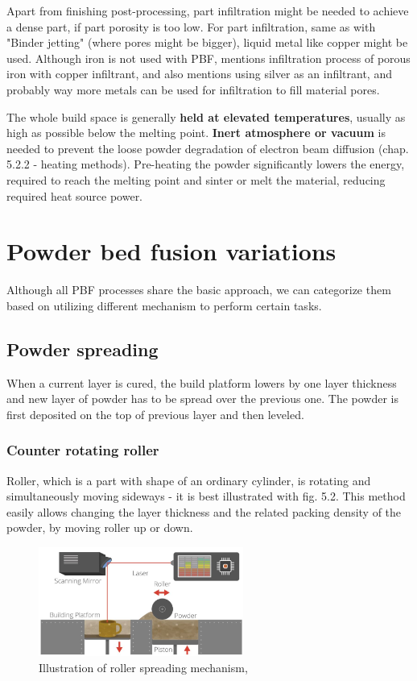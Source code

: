 \documentclass[a4paper, twoside, 11pt]{report}
\begin{document}
	Apart from finishing post-processing, part infiltration might be needed to achieve a dense part, if part porosity is too low. For part infiltration, same as with "Binder jetting" (where pores might be bigger), liquid metal like copper might be used. Although iron is not used with PBF, \cite[162]{LPS} mentions infiltration process of porous iron with copper infiltrant, and also mentions using silver as an infiltrant, and probably way more metals can be used for infiltration to fill material pores.
	
	The whole build space is generally \textbf{held at elevated temperatures}, usually as high as possible below the melting point. \textbf{Inert atmosphere or vacuum} is needed to prevent the loose powder degradation of electron beam diffusion (chap. 5.2.2 - heating methods). Pre-heating the powder significantly lowers the energy, required to reach the melting point and sinter or melt the material, reducing required heat source power.
	
\section{Powder bed fusion variations}
Although all PBF processes share the basic approach, we can categorize them based on utilizing different mechanism to perform certain tasks.

\subsection{Powder spreading}
When a current layer is cured, the build platform lowers by one layer thickness and new layer of powder has to be spread over the previous one. The powder is first deposited on the top of previous layer and then leveled.

\subsubsection{Counter rotating roller}
Roller, which is a part with shape of an ordinary cylinder, is rotating and simultaneously moving sideways - it is best illustrated with fig. 5.2. This method easily allows changing the layer thickness and the related packing density of the powder, by moving roller up or down.
\begin{figure}[b]
	\centering
 	\includegraphics[width=0.6\textwidth]{roller}
	\caption{Illustration of roller spreading mechanism, \cite{chinese} }
\end{figure}
\end{document}
